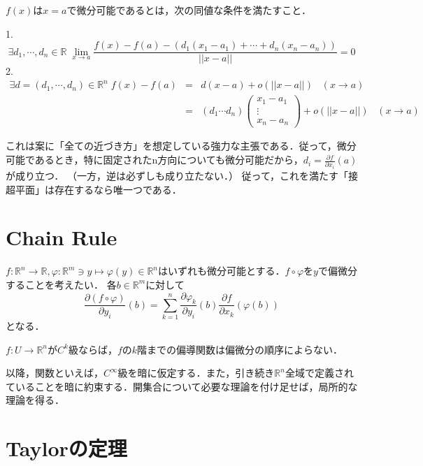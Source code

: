 \documentclass[uplatex, dvipdfmx]{jsreport}
\begin{document}
\begin{definition}[（全）微分可能性]
    $f(x)$は$x=a$で微分可能であるとは，次の同値な条件を満たすこと．

    1. \[ \exists d_1,\cdots,d_n\in\mathbb{R}\; \lim_{x\to a}\frac{f(x)-f(a)-(d_1(x_1-a_1)+\cdots+d_n(x_n-a_n))}{||x-a||} = 0 \]
    2. \begin{eqnarray*} \exists d=(d_1,\cdots,d_n)\in\mathbb{R}^n\; f(x)-f(a) &=& d(x-a) + o(||x-a||)\;\;\; (x\to a) \\
        &=& (d_1\cdots d_n)\left(\begin{array}{c}x_1-a_1 \\ \vdots \\ x_n-a_n\end{array}\right) + o(||x-a||)\;\;\; (x\to a)  \end{eqnarray*}
\end{definition}
これは案に「全ての近づき方」を想定している強力な主張である．従って，微分可能であるとき，特に固定されたn方向についても微分可能だから，$d_i=\frac{\partial f}{\partial x_i}(a)$が成り立つ．
（一方，逆は必ずしも成り立たない．）
従って，これを満たす「接超平面」は存在するなら唯一つである．

\section{Chain Rule}

\begin{theorem}
    $f:\mathbb{R}^n\to\mathbb{R}, \varphi:\mathbb{R}^m\ni y\mapsto \varphi(y)\in\mathbb{R}^n$はいずれも微分可能とする．$f\circ \varphi$を$y$で偏微分することを考えたい．
    各$b\in\mathbb{R}^m$に対して
    \[ \frac{\partial (f\circ\varphi)}{\partial y_i} (b) = \sum_{k=1}^n\frac{\partial \varphi_k}{\partial y_i}(b)\frac{\partial f}{\partial x_k}(\varphi(b)) \]
    となる．
\end{theorem}

\begin{theorem}\label{thm-exchange-of-partial-derivative}
    $f:U\to\mathbb{R}^n$が$C^k$級ならば，$f$の$k$階までの偏導関数は偏微分の順序によらない．
\end{theorem}

以降，関数といえば，$C^\infty$級を暗に仮定する．また，引き続き$\mathbb{R}^n$全域で定義されていることを暗に約束する．開集合について必要な理論を付け足せば，局所的な理論を得る．

\section{Taylorの定理}
\end{document}
